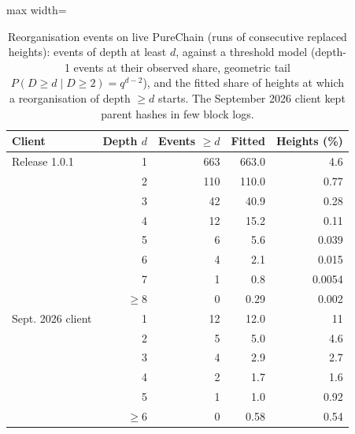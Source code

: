 \begin{table}[t]
\centering
\scriptsize
\caption{Reorganisation events on live PureChain (runs of consecutive replaced heights): events of depth at least $d$, against a threshold model (depth-1 events at their observed share, geometric tail $P(D\geq d\mid D\geq2)=q^{d-2}$), and the fitted share of heights at which a reorganisation of depth $\geq d$ starts. The September 2026 client kept parent hashes in few block logs.}
\label{tab:reorg}
\begin{adjustbox}{max width=\linewidth}
\begin{tabular}{lrrrr}
\toprule
Client & Depth $d$ & Events $\geq d$ & Fitted & Heights (\%) \\
\midrule
Release 1.0.1 & 1 & 663 & 663.0 & 4.6 \\
 & 2 & 110 & 110.0 & 0.77 \\
 & 3 & 42 & 40.9 & 0.28 \\
 & 4 & 12 & 15.2 & 0.11 \\
 & 5 & 6 & 5.6 & 0.039 \\
 & 6 & 4 & 2.1 & 0.015 \\
 & 7 & 1 & 0.8 & 0.0054 \\
 & $\geq$8 & 0 & 0.29 & 0.002 \\
Sept. 2026 client & 1 & 12 & 12.0 & 11 \\
 & 2 & 5 & 5.0 & 4.6 \\
 & 3 & 4 & 2.9 & 2.7 \\
 & 4 & 2 & 1.7 & 1.6 \\
 & 5 & 1 & 1.0 & 0.92 \\
 & $\geq$6 & 0 & 0.58 & 0.54 \\
\bottomrule
\end{tabular}\end{adjustbox}
\end{table}

